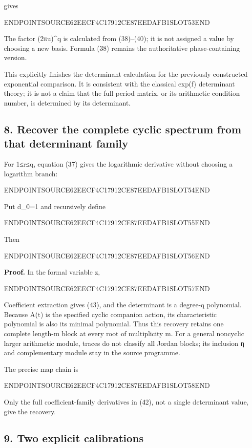 gives

ENDPOINTSOURCE62EECF4C17912CE87EEDAFB1SLOT53END

The factor (2π\textbar u\textbar)\^{}q is calculated from (38)--(40); it is not assigned a value by choosing a new basis. Formula (38) remains the authoritative phase-containing version.

This explicitly finishes the determinant calculation for the previously constructed exponential comparison. It is consistent with the classical exp(f) determinant theory; it is not a claim that the full period matrix, or its arithmetic condition number, is determined by its determinant.

\subsection{8. Recover the complete cyclic spectrum from that determinant family}\label{endpoint-sga_trace_period--recover-the-complete-cyclic-spectrum-from-that-determinant-family}

For 1≤r≤q, equation (37) gives the logarithmic derivative without choosing a logarithm branch:

ENDPOINTSOURCE62EECF4C17912CE87EEDAFB1SLOT54END

Put d\_0=1 and recursively define

ENDPOINTSOURCE62EECF4C17912CE87EEDAFB1SLOT55END

Then

ENDPOINTSOURCE62EECF4C17912CE87EEDAFB1SLOT56END

\textbf{Proof.} In the formal variable z,

ENDPOINTSOURCE62EECF4C17912CE87EEDAFB1SLOT57END

Coefficient extraction gives (43), and the determinant is a degree-q polynomial. Because A(t) is the specified cyclic companion action, its characteristic polynomial is also its minimal polynomial. Thus this recovery retains one complete length-m block at every root of multiplicity m. For a general noncyclic larger arithmetic module, traces do not classify all Jordan blocks; its inclusion η and complementary module stay in the source programme.

The precise map chain is

ENDPOINTSOURCE62EECF4C17912CE87EEDAFB1SLOT58END

Only the full coefficient-family derivatives in (42), not a single determinant value, give the recovery.

\subsection{9. Two explicit calibrations}\label{endpoint-sga_trace_period--two-explicit-calibrations}


